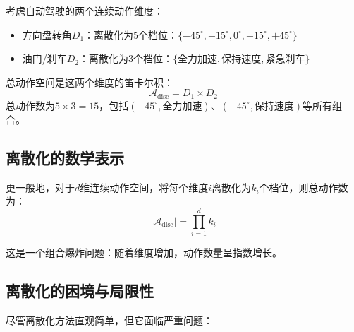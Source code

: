 \begin{example}[自动驾驶的二维动作离散化]
考虑自动驾驶的两个连续动作维度：
\begin{itemize}
    \item 方向盘转角$D_1$：离散化为5个档位：$\{-45^\circ, -15^\circ, 0^\circ, +15^\circ, +45^\circ\}$
    \item 油门/刹车$D_2$：离散化为3个档位：$\{\text{全力加速}, \text{保持速度}, \text{紧急刹车}\}$
\end{itemize}

总动作空间是这两个维度的笛卡尔积：
\[
\mathcal{A}_{\text{disc}} = D_1 \times D_2
\]
总动作数为$5 \times 3 = 15$，包括$(-45^\circ, \text{全力加速})$、$(-45^\circ, \text{保持速度})$等所有组合。
\end{example}

\subsection{离散化的数学表示}

更一般地，对于$d$维连续动作空间，将每个维度$i$离散化为$k_i$个档位，则总动作数为：
\[
|\mathcal{A}_{\text{disc}}| = \prod_{i=1}^{d} k_i
\]

这是一个组合爆炸问题：随着维度增加，动作数量呈指数增长。

\subsection{离散化的困境与局限性}

尽管离散化方法直观简单，但它面临严重问题：

